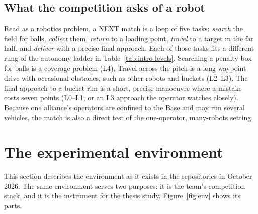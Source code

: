 \subsection{What the competition asks of a robot}

Read as a robotics problem, a NEXT match is a loop of five tasks: \emph{search} the field for balls, \emph{collect} them, \emph{return} to a loading point, \emph{travel} to a target in the far half, and \emph{deliver} with a precise final approach.
Each of those tasks fits a different rung of the autonomy ladder in Table~\ref{tab:intro-levels}.
Searching a penalty box for balls is a coverage problem (L4).
Travel across the pitch is a long waypoint drive with occasional obstacles, such as other robots and buckets (L2--L3).
The final approach to a bucket rim is a short, precise manoeuvre where a mistake costs seven points (L0--L1, or an L3 approach the operator watches closely).
Because one alliance's operators are confined to the Base and may run several vehicles, the match is also a direct test of the one-operator, many-robots setting.

\section{The experimental environment}
\label{sec:env}

This section describes the environment as it exists in the repositories in October 2026.
The same environment serves two purposes: it is the team's competition stack, and it is the instrument for the thesis study.
Figure~\ref{fig:env} shows its parts.

